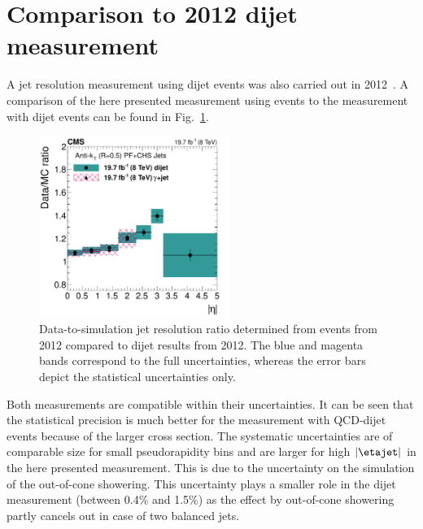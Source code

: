 \section{Comparison to 2012 dijet measurement}
\label{res:sec:comparison_2012}
A jet \pt resolution measurement using dijet events was also carried out in 2012~\cite{bib:Kristin_Thesis}.
A comparison of the here presented measurement using \GAMJET events to the measurement with dijet events can be found in Fig.~\ref{res:fig:Comparison_2012}.
\begin{figure}[!t]
 \centering
    \includegraphics[width=0.55\textwidth]{figures/resolution/results/JER_2012_compPhoton_final_v2.pdf}
  \caption{Data-to-simulation jet \pt resolution ratio determined from \GAMJET events from 2012 compared to dijet results from 2012.
           The blue and magenta bands correspond to the full uncertainties, whereas the error bars depict the statistical uncertainties only.}
  \label{res:fig:Comparison_2012}
\end{figure}
Both measurements are compatible within their uncertainties.
It can be seen that the statistical precision is much better for the measurement with QCD-dijet events because of the larger cross section.
The systematic uncertainties are of comparable size for small pseudorapidity bins and are larger for high $|\etajet|$ in the here presented measurement.
This is due to the uncertainty on the simulation of the out-of-cone showering.
This uncertainty plays a smaller role in the dijet measurement (between 0.4\% and 1.5\%) as the effect by out-of-cone showering partly cancels out in case of two balanced jets.
\FloatBarrier
